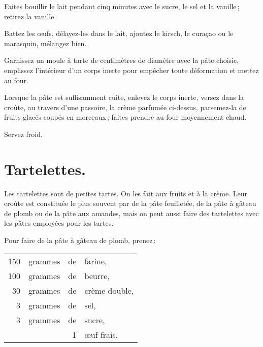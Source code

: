 Faites bouillir le lait pendant cinq minutes avec le sucre, le sel et la vanille ;
retirez la vanille.

Battez les œufs, délayez-les dans le lait, ajoutez le kirsch, le curaçao ou le
marasquin, mélangez bien.

Garnissez un moule à tarte de {\mmm} centimètres de diamètre avec la pâte
choisie, emplissez l'intérieur d'un corps inerte pour empêcher toute
déformation et mettez au four.

Lorsque la pâte est suffisamment cuite, enlevez le corps inerte, versez dans la
croûte, au travers d'une passoire, la crème parfumée ci-dessus, parsemez-la de
fruits glacés coupés en morceaux ; faites prendre au four moyennement chaud.

Servez froid.

\section*{\centering Tartelettes.}
{}

Les tartelettes sont de petites tartes. On les fait aux fruits et à la crème.
Leur croûte est constituée le plus souvent par de la pâte feuilletée, de la
pâte à gâteau de plomb ou de la pâte aux amandes, mais on peut aussi faire des
tartelettes avec les pâtes employées pour les tartes.

\sk

Pour faire de la pâte à gâteau de plomb, prenez :

\footnotesize
\begin{longtable}{rrrp{16em}}
    150 & grammes & de & farine,                                                                          \\
    100 & grammes & de & beurre,                                                                          \\
     30 & grammes & de & crème double,                                                                    \\
      3 & grammes & de & sel,                                                                             \\
      3 & grammes & de & sucre,                                                                           \\
        &         &  1 & œuf frais.                                                                       \\
\end{longtable}
\normalsize


